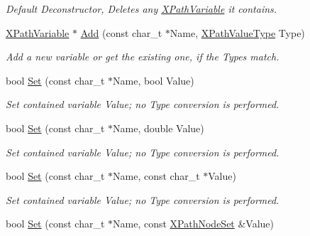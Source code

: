 \begin{DoxyCompactItemize}
\begin{DoxyCompactList}\small\item\em Default Deconstructor, Deletes any \hyperlink{classphys_1_1xml_1_1XPathVariable}{XPathVariable} it contains. \item\end{DoxyCompactList}\item 
\hyperlink{classphys_1_1xml_1_1XPathVariable}{XPathVariable} $\ast$ \hyperlink{classphys_1_1xml_1_1XPathVariableSet_a26c9bb8f7aa3aaedfcdcdca2e1822deb}{Add} (const char\_\-t $\ast$Name, \hyperlink{namespacephys_1_1xml_a339b9eef674ba44100110e5524bc575d}{XPathValueType} Type)
\begin{DoxyCompactList}\small\item\em Add a new variable or get the existing one, if the Types match. \item\end{DoxyCompactList}\item 
bool \hyperlink{classphys_1_1xml_1_1XPathVariableSet_a7095efef6fc3978479fb8b6f203c6f4c}{Set} (const char\_\-t $\ast$Name, bool Value)
\begin{DoxyCompactList}\small\item\em Set contained variable Value; no Type conversion is performed. \item\end{DoxyCompactList}\item 
bool \hyperlink{classphys_1_1xml_1_1XPathVariableSet_aa713e33048ee463a58b9e6988daab214}{Set} (const char\_\-t $\ast$Name, double Value)
\begin{DoxyCompactList}\small\item\em Set contained variable Value; no Type conversion is performed. \item\end{DoxyCompactList}\item 
bool \hyperlink{classphys_1_1xml_1_1XPathVariableSet_afa99a98b5c4e4790a921f67a153a9ff4}{Set} (const char\_\-t $\ast$Name, const char\_\-t $\ast$Value)
\begin{DoxyCompactList}\small\item\em Set contained variable Value; no Type conversion is performed. \item\end{DoxyCompactList}\item 
bool \hyperlink{classphys_1_1xml_1_1XPathVariableSet_a61fe3aa60d13a4a224d301456a230a7c}{Set} (const char\_\-t $\ast$Name, const \hyperlink{classphys_1_1xml_1_1XPathNodeSet}{XPathNodeSet} \&Value)

\end{DoxyCompactItemize}
